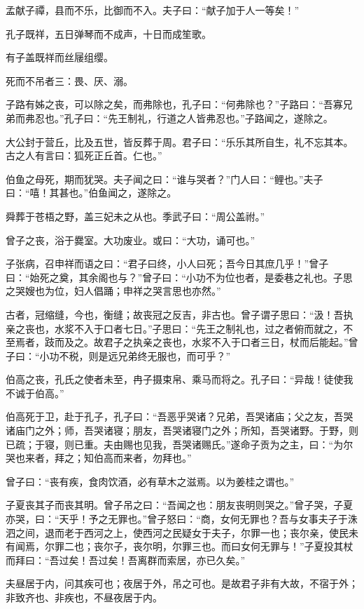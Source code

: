 \documentclass[]{article}
\begin{document}
孟献子禫，县而不乐，比御而不入。夫子曰：``献子加于人一等矣！''

孔子既祥，五日弹琴而不成声，十日而成笙歌。

有子盖既祥而丝屦组缨。

死而不吊者三：畏、厌、溺。

子路有姊之丧，可以除之矣，而弗除也，孔子曰：``何弗除也？''子路曰：``吾寡兄弟而弗忍也。''孔子曰：``先王制礼，行道之人皆弗忍也。''子路闻之，遂除之。

大公封于营丘，比及五世，皆反葬于周。君子曰：``乐乐其所自生，礼不忘其本。古之人有言曰：狐死正丘首。仁也。''

伯鱼之母死，期而犹哭。夫子闻之曰：``谁与哭者？''门人曰：``鲤也。''夫子曰：``嘻！其甚也。''伯鱼闻之，遂除之。

舜葬于苍梧之野，盖三妃未之从也。季武子曰：``周公盖祔。''

曾子之丧，浴于爨室。大功废业。或曰：``大功，诵可也。''

子张病，召申祥而语之曰：``君子曰终，小人曰死；吾今日其庶几乎！''曾子曰：``始死之奠，其余阁也与？''曾子曰：``小功不为位也者，是委巷之礼也。子思之哭嫂也为位，妇人倡踊；申祥之哭言思也亦然。''

古者，冠缩缝，今也，衡缝；故丧冠之反吉，非古也。曾子谓子思曰：``汲！吾执亲之丧也，水浆不入于口者七日。''子思曰：``先王之制礼也，过之者俯而就之，不至焉者，跂而及之。故君子之执亲之丧也，水浆不入于口者三日，杖而后能起。''曾子曰：``小功不税，则是远兄弟终无服也，而可乎？''

伯高之丧，孔氏之使者未至，冉子摄束帛、乘马而将之。孔子曰：``异哉！徒使我不诚于伯高。''

伯高死于卫，赴于孔子，孔子曰：``吾恶乎哭诸？兄弟，吾哭诸庙；父之友，吾哭诸庙门之外；师，吾哭诸寝；朋友，吾哭诸寝门之外；所知，吾哭诸野。于野，则已疏；于寝，则已重。夫由赐也见我，吾哭诸赐氏。''遂命子贡为之主，曰：``为尔哭也来者，拜之；知伯高而来者，勿拜也。''

曾子曰：``丧有疾，食肉饮酒，必有草木之滋焉。以为姜桂之谓也。''

子夏丧其子而丧其明。曾子吊之曰：``吾闻之也：朋友丧明则哭之。''曾子哭，子夏亦哭，曰：``天乎！予之无罪也。''曾子怒曰：``商，女何无罪也？吾与女事夫子于洙泗之间，退而老于西河之上，使西河之民疑女于夫子，尔罪一也；丧尔亲，使民未有闻焉，尔罪二也；丧尔子，丧尔明，尔罪三也。而曰女何无罪与！''子夏投其杖而拜曰：``吾过矣！吾过矣！吾离群而索居，亦已久矣。''

夫昼居于内，问其疾可也；夜居于外，吊之可也。是故君子非有大故，不宿于外；非致齐也、非疾也，不昼夜居于内。
\end{document}
